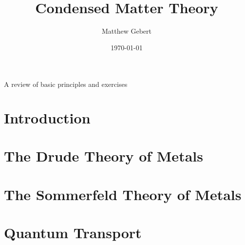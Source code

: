 \documentclass{report} %
\title{\myTitle Condensed Matter Theory}
\date{\today}
\author{Matthew Gebert}
\begin{document}
	{\let\newpage\relax\maketitle}
	\begingroup
	\centering
		\vspace{5mm}\LARGE A review of basic principles and exercises\\\vspace{1.5cm}	
	\endgroup
	\normalfont\normalsize
		
		
\renewcommand{\baselinestretch}{0.94}\normalsize
\tableofcontents
\renewcommand{\baselinestretch}{1}\normalsize
\chapter*{Introduction}



\chapter{The Drude Theory of Metals}

\renewcommand{\thesubsubsection}{\thesubsection.\alph{subsubsection})}

\renewcommand{\thesubsubsection}{\thesubsection.\arabic{subsubsection}}

\chapter{The Sommerfeld Theory of Metals}


\chapter{Quantum Transport}







\end{document}
